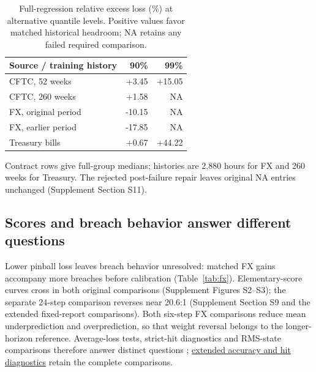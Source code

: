\documentclass{rQUF2e}
\begin{document}
\begin{table}[htbp]\centering\small
\caption{Full-regression relative excess loss (\%) at alternative quantile levels. Positive values favor matched historical headroom; NA retains any failed required comparison.}\label{tab:v12-tau}
\begin{tabular}{lrr}\toprule
Source / training history & 90\% & 99\% \\\midrule
CFTC, 52 weeks & +3.45 & +15.05 \\
CFTC, 260 weeks & +1.58 & \textsc{NA} \\
FX, original period & -10.15 & \textsc{NA} \\
FX, earlier period & -17.85 & \textsc{NA} \\
Treasury bills & +0.67 & +44.22 \\
\bottomrule\end{tabular}
\par\vspace{2pt}\begin{minipage}{.95\linewidth}\footnotesize
Contract rows give full-group medians; histories are 2,880 hours for FX and 260 weeks for Treasury.
The rejected post-failure repair leaves original NA entries unchanged (Supplement Section S11).
\end{minipage}\end{table}


\subsection{Scores and breach behavior answer different questions}

Lower pinball loss leaves breach behavior unresolved: matched FX gains accompany more breaches before calibration (Table~\ref{tab:fx}). Elementary-score curves cross in both original comparisons (Supplement Figures S2--S3); the separate 24-step comparison reverses near 20.6:1 (Supplement Section S9 and the extended fixed-report comparisons). Both six-step FX comparisons reduce mean underprediction and overprediction, so that weight reversal belongs to the longer-horizon reference. Average-loss tests, strict-hit diagnostics and RMS-state comparisons therefore answer distinct questions \citep{gw2006}; \href{https://github.com/ByronLi0207/financial-mathematics-paper-20261020/blob/submission-final/EXTENDED_RESULTS.md#asmbi-extended-s33}{extended accuracy and hit diagnostics} retain the complete comparisons.

\FloatBarrier
\end{document}
